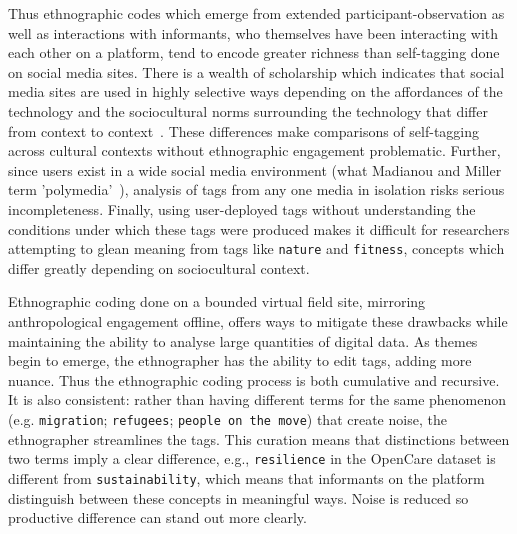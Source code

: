 \begin{enumerate}
% 
% 

\end{enumerate}

Thus ethnographic codes which emerge from extended participant-observation as well as interactions with informants, who themselves have been interacting with each other on a platform, tend to encode greater richness than self-tagging done on social media sites. There is a wealth of scholarship which indicates that social media sites are used in highly selective ways depending on the affordances of the technology and the sociocultural norms surrounding the technology that differ from context to context~\cite{Haythornthwaite2005,Miller2011}. These differences make comparisons of self-tagging across cultural contexts without ethnographic engagement problematic. Further, since users exist in a wide social media environment (what Madianou and Miller term 'polymedia'~\cite{Madianou2012}), analysis of tags from any one media in isolation risks serious incompleteness. Finally, using user-deployed tags without understanding the conditions under which these tags were produced makes it difficult for researchers attempting to glean meaning from tags like \texttt{nature} and \texttt{fitness}, concepts which differ greatly depending on sociocultural context.

Ethnographic coding done on a bounded virtual field site, mirroring anthropological engagement offline, offers ways to mitigate these drawbacks while maintaining the ability to analyse large quantities of digital data. As themes begin to emerge, the ethnographer has the ability to edit tags, adding more nuance. Thus the ethnographic coding process is both cumulative and recursive. It is also consistent: rather than having different terms for the same phenomenon (e.g. \texttt{migration}; \texttt{refugees}; \texttt{people on the move}) that create noise, the ethnographer streamlines the tags. This curation means that distinctions between two terms imply a clear difference, e.g., \texttt{resilience} in the OpenCare dataset is different from \texttt{sustainability}, which means that informants on the platform distinguish between these concepts in meaningful ways. Noise is reduced so productive difference can stand out more clearly.


